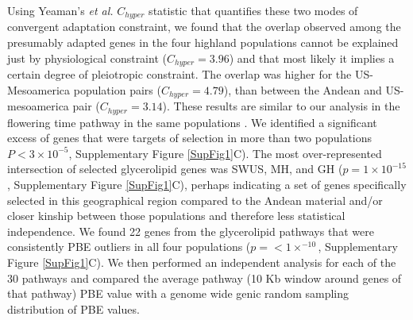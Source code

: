\documentclass[9pt,twocolumn,twoside,lineno]{BioRxiv}
\begin{document}
Using Yeaman's \textit{et al.} $C_{hyper}$ statistic \cite{yeaman2018} that quantifies these two modes of convergent adaptation constraint, we found that the overlap observed among the presumably adapted genes in the four highland populations cannot be explained just by physiological constraint ($C_{hyper} = 3.96$) and that most likely it implies a certain degree of pleiotropic constraint.
The overlap was higher for the US-Mesoamerica population pairs ($C_{hyper} = 4.79$), than between the Andean and US-mesoamerica pair ($C_{hyper} = 3.14$).
These results are similar to our analysis in the flowering time pathway in the same populations \cite{Wang2020-mp}.
We identified a significant excess of genes that were targets of selection in more than two populations $P< 3 \times 10^{-5}$, Supplementary Figure \ref{SupFig1}C).
The most over-represented intersection of selected glycerolipid genes was SWUS, MH, and GH ($p = 1  \times 10 ^{-15} $, Supplementary Figure \ref{SupFig1}C), perhaps indicating a set of genes specifically selected in this geographical region compared to the Andean material and/or closer kinship between those populations and therefore less statistical independence.
We found 22 genes from the glycerolipid pathways that were consistently PBE outliers in all four populations ($p =<1  \times  ^{-10}$, Supplementary Figure \ref{SupFig1}C). 
We then performed an independent analysis for each of the 30 pathways and compared the average pathway (10 Kb window around genes of that pathway) PBE value with a genome wide genic random sampling distribution of PBE values. 
\end{document}
